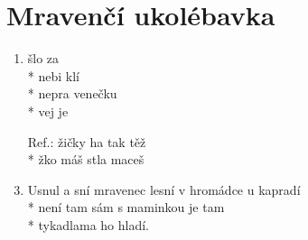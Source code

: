 \section{Mravenčí ukolébavka}
\begin{enumerate}
\item {} šlo  za   \\*
 nebi  klí \\*
 nepra venečku  \\*
vej   je 
\item[Ref.:]  žičky ha   tak těž \\*
 žko máš stla   maceš 
\item Usnul a sní mravenec lesní v hromádce u kapradí \\*
není tam sám s maminkou je tam \\*
tykadlama ho hladí. 
\end{enumerate}

